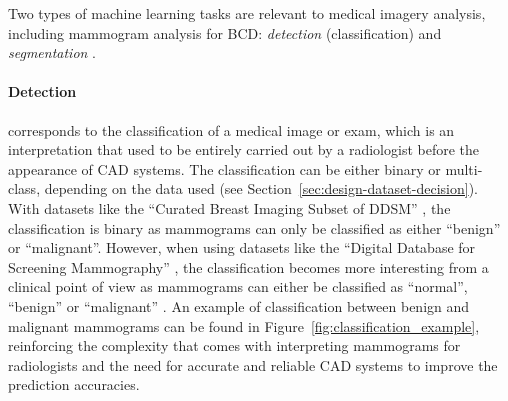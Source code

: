 Two types of machine learning tasks are relevant to medical imagery analysis, including mammogram analysis for BCD: \textit{detection} (classification) and \textit{segmentation} \citep{Litjens2017}. 

\paragraph{Detection} corresponds to the classification of a medical image or exam, which is an interpretation that used to be entirely carried out by a radiologist before the appearance of CAD systems. The classification can be either binary or multi-class, depending on the data used (see Section~\ref{sec:design-dataset-decision}). With datasets like the ``Curated Breast Imaging Subset of DDSM'' \citep{Lee2017}, the classification is binary as mammograms can only be classified as either ``benign'' or ``malignant''. However, when using datasets like the ``Digital Database for Screening Mammography'' \citep{DDSMdataset2001}, the classification becomes more interesting from a clinical point of  view as mammograms can either be classified as ``normal'', ``benign'' or ``malignant'' \citep{Litjens2017}. An example of classification between benign and malignant mammograms can be found in Figure~\ref{fig:classification_example}, reinforcing the complexity that comes with interpreting mammograms for radiologists and the need for accurate and reliable CAD systems to improve the prediction accuracies.


